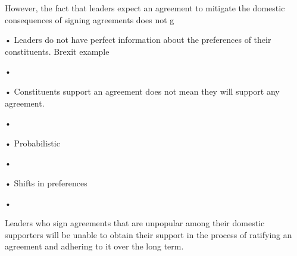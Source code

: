 However, the fact that leaders expect an agreement to mitigate the domestic consequences of signing agreements does not g















•	Leaders do not have perfect information about the preferences of their constituents. Brexit example







•	







•	Constituents support an agreement does not mean they will support any agreement. 







•	







•	Probabilistic







•	







•	Shifts in preferences







•	







Leaders who sign agreements that are unpopular among their domestic supporters will be unable to obtain their support in the process of ratifying an agreement and adhering to it over the long term. 






























